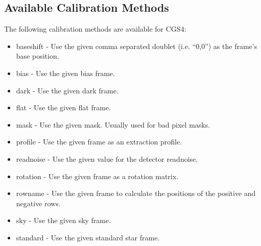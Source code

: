 \documentclass[twoside,11pt]{article}
\renewcommand{\_}{\texttt{\symbol{95}}}
\begin{document}
\subsection{Available Calibration Methods}

The following calibration methods are available for CGS4:

\begin{itemize}

\item baseshift - Use the given comma separated doublet (i.e. ``0,0'') as the
frame's base position.

\item bias - Use the given bias frame.

\item dark - Use the given dark frame.

\item flat - Use the given flat frame.

\item mask - Use the given mask. Usually used for bad pixel masks.

\item profile - Use the given frame as an extraction profile.

\item readnoise - Use the given value for the detector readnoise.

\item rotation - Use the given frame as a rotation matrix.

\item rowname - Use the given frame to calculate the positions of the positive
and negative rows.

\item sky - Use the given sky frame.

\item standard - Use the given standard star frame.

\end{itemize}

\end{document}
